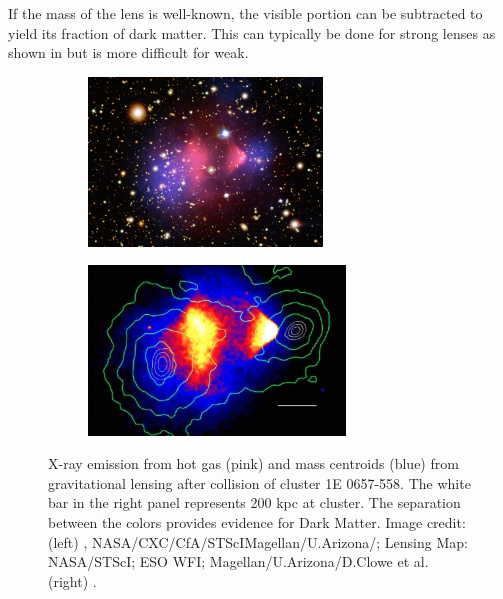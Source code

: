 If the mass of the lens is well-known, the visible portion can be subtracted to yield its fraction of dark matter.  This can typically
be done for strong lenses as shown in  but is more difficult for weak.



\begin{figure}
    \centering
    \begin{subfigure}[t]{0.45\textwidth}
        \centering
        \includegraphics[height=4.5cm]{chandra_bullett_preview}
    \end{subfigure}%
    \begin{subfigure}[t]{0.45\textwidth}
        \centering
        \includegraphics[height=4.5cm]{bullet_cluster_paper}
    \end{subfigure}
    \caption{X-ray emission from hot gas (pink) and mass centroids (blue) from gravitational lensing after
	collision of cluster 1E 0657-558.  The white bar in the right panel represents 200 kpc at cluster.  The separation
	between the colors provides evidence for Dark Matter.
	Image credit: (left) , NASA/CXC/CfA/STScIMagellan/U.Arizona/;
	Lensing Map: NASA/STScI; ESO WFI; Magellan/U.Arizona/D.Clowe et al. (right) .}
	\label{fig:bullet_cluster}
\end{figure}

